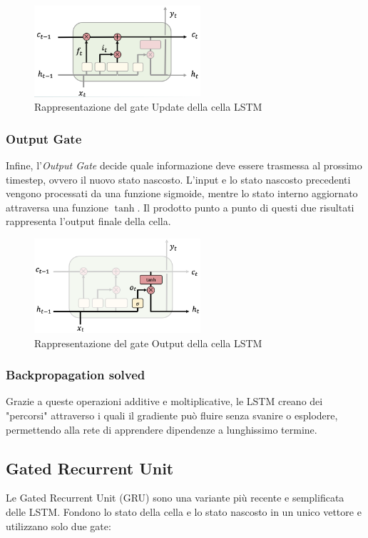 \begin{figure}[!ht]
    \centering
    \includegraphics[width=0.55\textwidth]{figure/UpdateLSTM.png}
    \caption{Rappresentazione del gate Update della cella LSTM}
    \label{fig:LSTMUpdate}
\end{figure}

\subsubsection{Output Gate}
Infine, l’\textit{Output Gate} decide quale informazione deve essere trasmessa al prossimo timestep, ovvero il nuovo stato nascosto. L'input e lo stato nascosto precedenti vengono processati da una funzione sigmoide, mentre lo stato interno aggiornato attraversa una funzione $\tanh$. Il prodotto punto a punto di questi due risultati rappresenta l'output finale della cella.

\begin{figure}[!ht]
    \centering
    \includegraphics[width=0.55\textwidth]{figure/OutputLSTM.png}
    \caption{Rappresentazione del gate Output della cella LSTM}
    \label{fig:LSTMOutput}
\end{figure}

\subsubsection{Backpropagation solved}
Grazie a queste operazioni additive e moltiplicative, le LSTM creano dei "percorsi" attraverso i quali il gradiente può fluire senza svanire o esplodere, permettendo alla rete di apprendere dipendenze a lunghissimo termine.

\subsection{Gated Recurrent Unit}
Le Gated Recurrent Unit (GRU) sono una variante più recente e semplificata delle LSTM. Fondono lo stato della cella e lo stato nascosto in un unico vettore e utilizzano solo due gate:

